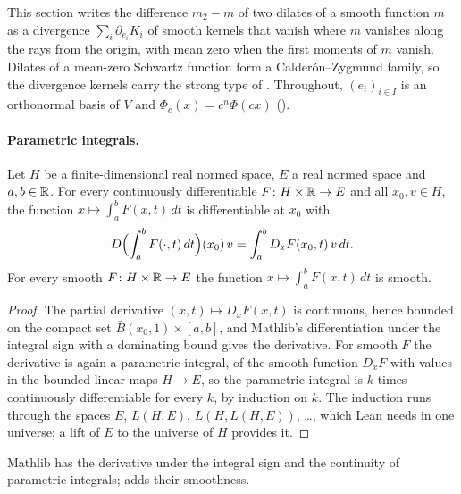 This section writes the difference $m_2 - m$ of two dilates of a smooth function $m$ as a
divergence $\sum_i \partial_{e_i} K_i$ of smooth kernels that vanish where $m$ vanishes along the
rays from the origin, with mean zero when the first moments of $m$ vanish. Dilates of a
mean-zero Schwartz function form a Calder\'on--Zygmund family, so the divergence kernels carry
the strong type of . Throughout, $(e_i)_{i \in I}$ is an
orthonormal basis of $V$ and $\Phi_c(x) = c^n \Phi(c x)$ ().

\paragraph{Parametric integrals.}

\begin{lemma}
\label{lem:parametric-integral-smooth}
\leanok
Let $H$ be a finite-dimensional real normed space, $E$ a real normed space and $a, b \in \mathbb{R}$.
For every continuously differentiable $F \colon H \times \mathbb{R} \to E$ and all $x_0, v \in H$, the
function $x \mapsto \int_a^b F(x, t) \, dt$ is differentiable at $x_0$ with
\[
  D\Bigl(\int_a^b F(\cdot, t) \, dt\Bigr)(x_0) \, v = \int_a^b D_x F(x_0, t) \, v \, dt .
\]
For every smooth $F \colon H \times \mathbb{R} \to E$ the function $x \mapsto \int_a^b F(x, t) \, dt$
is smooth.
\end{lemma}

\begin{proof}
\leanok
The partial derivative $(x, t) \mapsto D_x F(x, t)$ is continuous, hence bounded on the compact
set $\bar B(x_0, 1) \times [a, b]$, and Mathlib's differentiation under the integral sign
with a dominating bound gives the derivative. For smooth $F$ the derivative is again a
parametric integral, of the smooth function
$D_x F$ with values in the bounded linear maps $H \to E$, so the parametric integral is
$k$ times continuously differentiable for every $k$, by induction on $k$. The induction runs
through the spaces $E$, $L(H, E)$, $L(H, L(H, E))$, \dots, which Lean needs in one universe; a
lift of $E$ to the universe of $H$ provides it.
\end{proof}

Mathlib has the derivative under the integral sign and the continuity of parametric integrals;
 adds their smoothness.

